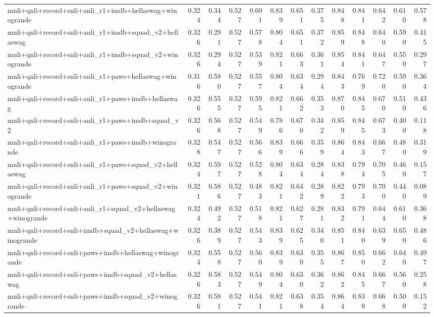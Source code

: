 \begin{table}[t]
\begin{tabular}{lrrrrrrrrrrrr}
    mnli+qnli+record+snli+anli\_r1+imdb+hellaswag+winogrande & 0.324 & 0.344 & 0.527 & 0.601 & 0.839 & 0.651 & 0.375 & 0.848 & 0.841 & 0.642 & 0.610 & 0.578 \\
    mnli+qnli+record+snli+anli\_r1+imdb+squad\_v2+hellaswag & 0.326 & 0.291 & 0.527 & 0.578 & 0.804 & 0.651 & 0.372 & 0.859 & 0.848 & 0.640 & 0.590 & 0.415 \\
    mnli+qnli+record+snli+anli\_r1+imdb+squad\_v2+winogrande & 0.326 & 0.294 & 0.527 & 0.539 & 0.821 & 0.663 & 0.361 & 0.854 & 0.841 & 0.647 & 0.550 & 0.297 \\
    mnli+qnli+record+snli+anli\_r1+paws+hellaswag+winogrande & 0.316 & 0.580 & 0.527 & 0.557 & 0.804 & 0.634 & 0.294 & 0.843 & 0.769 & 0.720 & 0.590 & 0.364 \\
    mnli+qnli+record+snli+anli\_r1+paws+imdb+hellaswag & 0.326 & 0.555 & 0.527 & 0.595 & 0.821 & 0.662 & 0.353 & 0.870 & 0.845 & 0.670 & 0.510 & 0.436 \\
    mnli+qnli+record+snli+anli\_r1+paws+imdb+squad\_v2 & 0.326 & 0.568 & 0.527 & 0.549 & 0.786 & 0.670 & 0.342 & 0.859 & 0.845 & 0.673 & 0.400 & 0.118 \\
    mnli+qnli+record+snli+anli\_r1+paws+imdb+winogrande & 0.328 & 0.547 & 0.527 & 0.566 & 0.839 & 0.666 & 0.359 & 0.864 & 0.843 & 0.667 & 0.480 & 0.319 \\
    mnli+qnli+record+snli+anli\_r1+paws+squad\_v2+hellaswag & 0.324 & 0.597 & 0.527 & 0.528 & 0.804 & 0.634 & 0.284 & 0.838 & 0.794 & 0.705 & 0.460 & 0.157 \\
    mnli+qnli+record+snli+anli\_r1+paws+squad\_v2+winogrande & 0.321 & 0.586 & 0.527 & 0.483 & 0.821 & 0.642 & 0.289 & 0.822 & 0.793 & 0.700 & 0.440 & 0.089 \\
    mnli+qnli+record+snli+anli\_r1+squad\_v2+hellaswag+winogrande & 0.324 & 0.492 & 0.527 & 0.518 & 0.821 & 0.627 & 0.281 & 0.832 & 0.791 & 0.644 & 0.610 & 0.368 \\
    mnli+qnli+record+snli+imdb+squad\_v2+hellaswag+winogrande & 0.326 & 0.389 & 0.527 & 0.543 & 0.839 & 0.625 & 0.340 & 0.851 & 0.840 & 0.639 & 0.650 & 0.486 \\
    mnli+qnli+record+snli+paws+imdb+hellaswag+winogrande & 0.324 & 0.558 & 0.527 & 0.560 & 0.839 & 0.630 & 0.355 & 0.867 & 0.850 & 0.662 & 0.640 & 0.497 \\
    mnli+qnli+record+snli+paws+imdb+squad\_v2+hellaswag & 0.326 & 0.583 & 0.527 & 0.549 & 0.804 & 0.630 & 0.362 & 0.862 & 0.845 & 0.667 & 0.560 & 0.258 \\
    mnli+qnli+record+snli+paws+imdb+squad\_v2+winogrande & 0.326 & 0.581 & 0.527 & 0.541 & 0.821 & 0.638 & 0.354 & 0.864 & 0.839 & 0.668 & 0.500 & 0.152 \\

\end{tabular}
\end{table}
